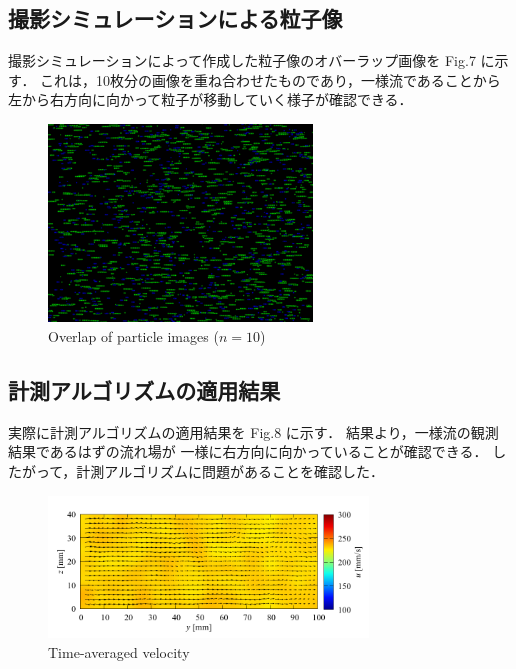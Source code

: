 \documentclass[twocolumn,a4j]{jsarticle}
\begin{document}
\subsection{撮影シミュレーションによる粒子像}
撮影シミュレーションによって作成した粒子像のオバーラップ画像を Fig.7 に示す．
これは，10枚分の画像を重ね合わせたものであり，一様流であることから
左から右方向に向かって粒子が移動していく様子が確認できる．

\begin{figure}[htbp]
  \centering
  \includegraphics[keepaspectratio, width=70mm]{../images/UniformFlow/UniformFlow_by_Simulation.bmp}
  \caption{Overlap of particle images ($n = 10$)}
\end{figure}

\subsection{計測アルゴリズムの適用結果}
実際に計測アルゴリズムの適用結果を Fig.8 に示す．
結果より，一様流の観測結果であるはずの流れ場が
一様に右方向に向かっていることが確認できる．
したがって，計測アルゴリズムに問題があることを確認した．

\begin{figure}[htbp]
  \centering
  \includegraphics[keepaspectratio, width=85mm]{../images/UniformFlow/velocity_xyz.png}
  \caption{Time-averaged velocity}
\end{figure}
\end{document}
